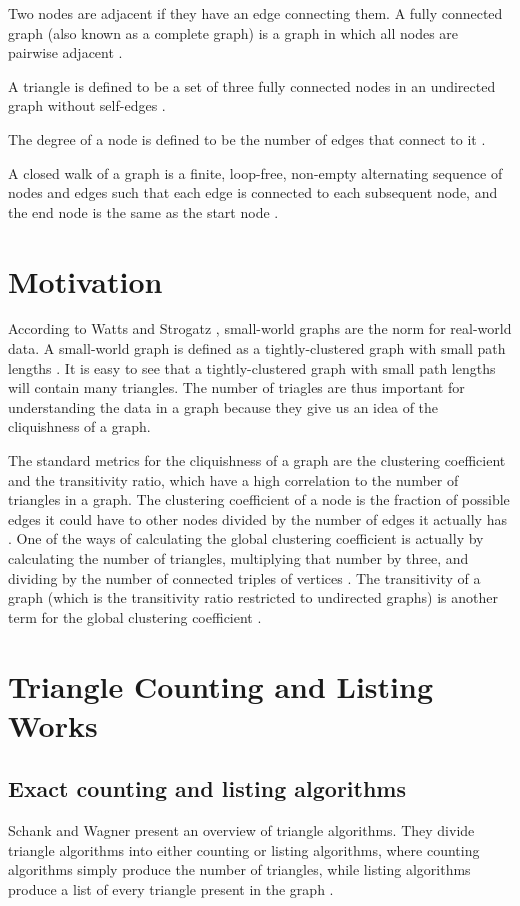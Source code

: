 \documentclass{acm_proc_article-sp}
\begin{document}
Two nodes are adjacent if they have an edge connecting them. A fully
connected graph (also known as a complete graph) is a graph in which all
nodes are pairwise adjacent \cite{diestel}.

A triangle is defined to be a set of three fully connected nodes in an
undirected graph without self-edges \cite{original}.

The degree of a node is defined to be the number of edges that connect to it
\cite{diestel}.

A closed walk of a graph is a finite, loop-free, non-empty alternating sequence
of nodes and edges such that each edge is connected to each subsequent node,
and the end node is the same as the start node \cite{diestel}.

\section{Motivation}
According to Watts and Strogatz \cite{watts}, small-world graphs are the norm
for real-world data.
A small-world graph is defined as a tightly-clustered graph with small path
lengths \cite{watts}. It is easy to see that a tightly-clustered graph with
small path lengths will contain many triangles. The number of triagles are thus
important for understanding the data in a graph because they give us an idea of
the cliquishness of a graph.

The standard metrics for the cliquishness of a graph are the clustering
coefficient and the transitivity ratio, which have a high correlation to the
number of triangles in a graph. The clustering coefficient of a
node is the fraction of possible edges it could have to other nodes divided by
the number of edges it actually has \cite{watts}. One of the ways of
calculating the global clustering coefficient is actually by calculating the
number of triangles, multiplying that number by three, and dividing by the
number of connected triples of vertices \cite{newman}.
The transitivity of a graph (which is the transitivity ratio restricted to
undirected graphs) is another term for the global clustering
coefficient \cite{schank:cluster}.

\section{Triangle Counting and Listing Works}

\subsection{Exact counting and listing algorithms}
Schank and Wagner present an overview of triangle algorithms. They divide
triangle algorithms into either counting or listing algorithms, where counting
algorithms simply produce the number of triangles, while listing algorithms
produce a list of every triangle present in the graph \cite{schank:counting}.
\end{document}
